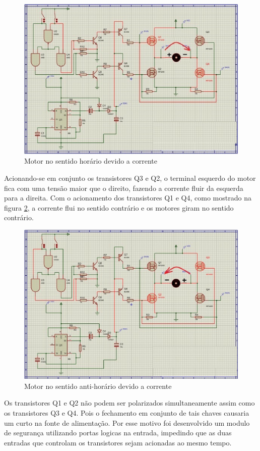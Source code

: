 \begin{figure}[!htb]
	\centering
	\includegraphics[keepaspectratio=true,scale=0.5]{figuras/referencialteorico/figurax_2.eps}
	\caption{Motor no sentido horário devido a corrente}
	\label{fig:motor_clockwise}
\end{figure}

Acionando-se em conjunto os transistores Q3 e Q2, o terminal esquerdo do motor fica com uma tensão maior que o direito, fazendo a corrente fluir da esquerda para a direita. Com o acionamento dos transistores Q1 e Q4, como mostrado na figura \ref{fig:motor_counterclockwise}, a corrente flui no sentido contrário e os motores giram no sentido contrário.

\begin{figure}[!htb]
	\centering
	\includegraphics[keepaspectratio=true,scale=1]{figuras/referencialteorico/figurax_3.eps}
	\caption{Motor no sentido anti-horário devido a corrente}
	\label{fig:motor_counterclockwise}
\end{figure}

Os transistores Q1 e Q2 não podem ser polarizados simultaneamente assim como os transistores Q3 e Q4. Pois o fechamento em conjunto de tais chaves causaria um curto na fonte de alimentação. Por esse motivo foi desenvolvido um modulo de segurança utilizando portas logicas na entrada, impedindo que as duas entradas que controlam os transistores sejam acionadas ao mesmo tempo.
